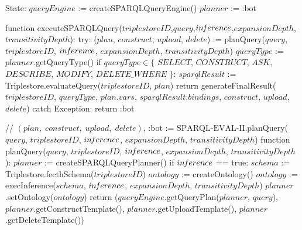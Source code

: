 State:
    $queryEngine$ := createSPARQLQueryEngine()
    $planner$ := :bot

function executeSPARQLQuery($triplestoreID$,$query$,$in\textrm{\emph{f}}erence$,$expansionDepth$,$transitivityDepth$):
    try:
        ($plan$, $construct$, $upload$, $delete$) := planQuery($query$, $triplestoreID$, $in\textrm{\emph{f}}erence$, $expansionDepth$, $transitivityDepth$) 
        $queryType$ := $planner$.getQueryType()
        if $queryType \in \{$ $SELECT$, $CONSTRUCT$, $ASK$, $DESCRIBE$, $MODIFY$, $DELETE\_WHERE$ $\}$:
            $sparqlResult$ := Triplestore.evaluateQuery($triplestoreID$, $plan$)
        return generateFinalResult($triplestoreID$, $queryType$, $plan$.$vars$, $sparqlResult$.$bindings$, $construct$, $upload$, $delete$)
    catch Exception:
        return :bot

// {$(plan, \; construct, \; upload, \; delete)$, :bot} := $\textrm{SPARQL-EVAL-II}$.planQuery($query$, $triplestoreID$, $in\textrm{\emph{f}}erence$, $expansionDepth$, $transitivityDepth$)
function planQuery($query$, $triplestoreID$, $in\textrm{\emph{f}}erence$, $expansionDepth$, $transitivityDepth$):
    $planner$ := createSPARQLQueryPlanner()
    if $in\textrm{\emph{f}}erence$ == true:
        $schema$ := Triplestore.fecthSchema($triplestoreID$)
        $ontology$ := createOntology()
        $ontology$ := execInference($schema$, $in\textrm{\emph{f}}erence$, $expansionDepth$, $transitivityDepth$)
        $planner$.setOntology($ontology$)   
    return ($queryEngine$.getQueryPlan($planner$, $query$), $planner$.getConstructTemplate(), $planner$.getUploadTemplate(), $planner$.getDeleteTemplate())
